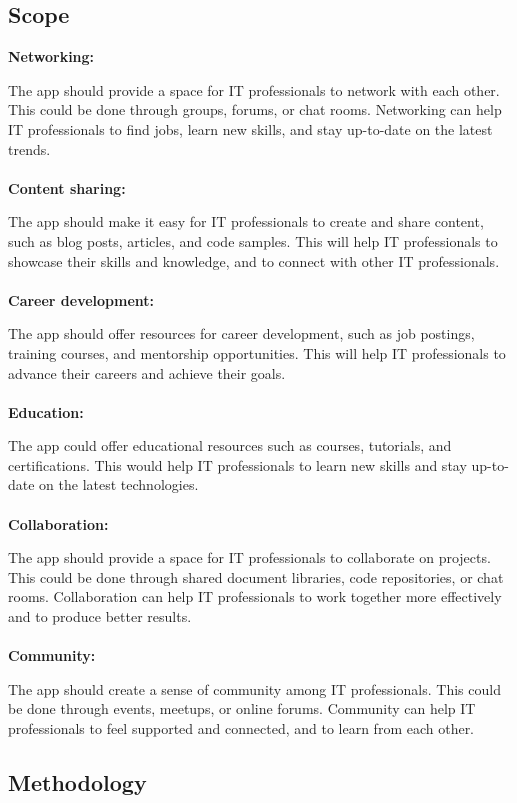 \documentclass{article}
\begin{document}
\subsection{Scope}
\textbf{Networking:}


The app should provide a space for IT professionals to network with each other. This could be done through groups, forums, or chat rooms. Networking can help IT professionals to find jobs, learn new skills, and stay up-to-date on the latest trends.\\\\
\textbf{Content sharing:}


The app should make it easy for IT professionals to create and share content, such as blog posts, articles, and code samples. This will help IT professionals to showcase their skills and knowledge, and to connect with other IT professionals.\\\\
\textbf{Career development:}


The app should offer resources for career development, such as job postings, training courses, and mentorship opportunities. This will help IT professionals to advance their careers and achieve their goals.\\\\
\textbf{Education:}


The app could offer educational resources such as courses, tutorials, and certifications. This would help IT professionals to learn new skills and stay up-to-date on the latest technologies.\\\\
\textbf{Collaboration:}


The app should provide a space for IT professionals to collaborate on projects. This could be done through shared document libraries, code repositories, or chat rooms. Collaboration can help IT professionals to work together more effectively and to produce better results.\\\\
\textbf{Community:}


The app should create a sense of community among IT professionals. This could be done through events, meetups, or online forums. Community can help IT professionals to feel supported and connected, and to learn from each other.\\

\subsection{Methodology}
\end{document}
